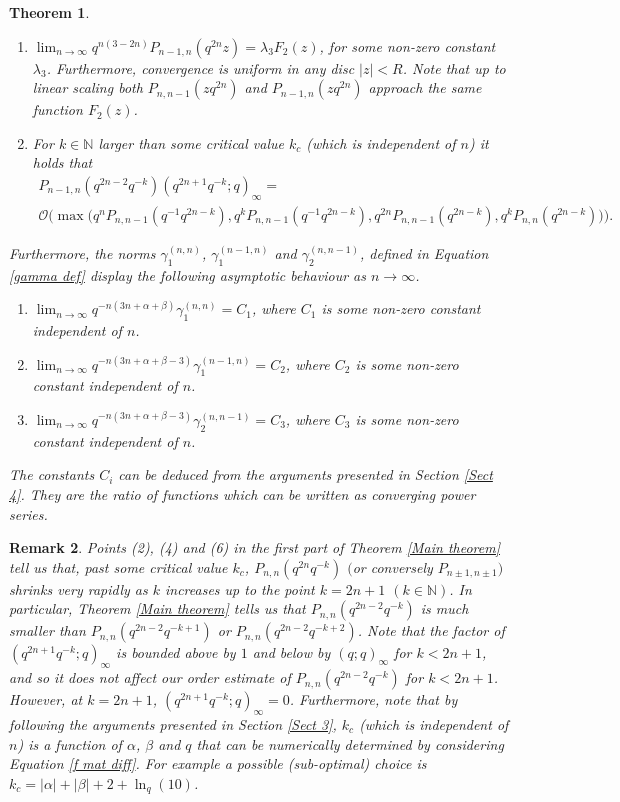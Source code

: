 \documentclass[a4paper,reqno]{amsart}
\numberwithin{equation}{section}
\newtheorem{theorem}{Theorem}[section]
\newtheorem{remark}[theorem]{Remark}
\numberwithin{figure}{section}
\begin{document}
\begin{theorem}
\begin{enumerate}
        \item $\lim_{n\to\infty} q^{n(3-2n)}P_{n-1,n}(q^{2n}z) = \lambda_3 F_2(z)$, for some non-zero constant $\lambda_3$. Furthermore, convergence is uniform in any disc $|z|<R$. Note that up to linear scaling both $P_{n,n-1}(zq^{2n})$ and $P_{n-1,n}(zq^{2n})$ approach the same function $F_2(z)$. 
       \item For $k\in\mathbb{N}$ larger than some critical value $k_c$ (which is independent of $n$) it holds that
        \begin{multline}\nonumber
            P_{n-1,n}(q^{2n-2}q^{-k})(q^{2n+1}q^{-k};q)_\infty =  \\\mathcal{O}\Big(\max\big(q^{n}P_{n,n-1}(q^{-1}q^{2n-k}), q^{k}P_{n,n-1}(q^{-1}q^{2n-k}), q^{2n}P_{n,n-1}(q^{2n-k}),q^{k}P_{n,n}(q^{2n-k})\big)\Big).
        \end{multline}
 
    \end{enumerate}
Furthermore, the norms $\gamma_1^{(n,n)}$, $\gamma_1^{(n-1,n)}$ and $\gamma_2^{(n,n-1)}$, defined in Equation \eqref{gamma def} display the following asymptotic behaviour as $n\to\infty$.
    \begin{enumerate}
    \item $\lim_{n\to\infty}q^{-n(3n+\alpha+\beta)}\gamma_1^{(n,n)} = C_1$, where $C_1$ is some non-zero constant independent of $n$.
    \item $\lim_{n\to\infty}q^{-n(3n+\alpha+\beta-3)}\gamma_1^{(n-1,n)} = C_2$, where $C_2$ is some non-zero constant independent of $n$.
    \item $\lim_{n\to\infty}q^{-n(3n+\alpha+\beta-3)}\gamma_2^{(n,n-1)} = C_3$, where $C_3$ is some non-zero constant independent of $n$.
    \end{enumerate}
    The constants $C_i$ can be deduced from the arguments presented in Section \ref{Sect 4}. They are the ratio of functions which can be written as converging power series.
\end{theorem}

\begin{remark}
   Points (2), (4) and (6) in the first part of Theorem \ref{Main theorem} tell us that, past some critical value $k_c$,  $P_{n,n}(q^{2n}q^{-k})$ $($or conversely $P_{n\pm1,n\pm1})$ shrinks very rapidly as $k$ increases up to the point $k = 2n+1$ $(k\in\mathbb{N})$. In particular, Theorem \ref{Main theorem} tells us that $P_{n,n}(q^{2n-2}q^{-k})$ is much smaller than $P_{n,n}(q^{2n-2}q^{-k+1})$ or $P_{n,n}(q^{2n-2}q^{-k+2})$. Note that the factor of $(q^{2n+1}q^{-k};q)_\infty$ is bounded above by $1$ and below by $(q;q)_\infty$ for $k<2n+1$, and so it does not affect our order estimate of $P_{n,n}(q^{2n-2}q^{-k})$ for $k<2n+1$.  However, at $k=2n+1$, $(q^{2n+1}q^{-k};q)_\infty=0$. Furthermore, note that by following the arguments presented in Section \ref{Sect 3}, $k_c$ (which is independent of $n$) is a function of $\alpha$, $\beta$ and $q$ that can be numerically determined by considering Equation \eqref{f mat diff}. For example a possible (sub-optimal) choice is $k_c=|\alpha|+|\beta|+2+\ln_q(10)$.
    
\end{remark} 
\end{document}
